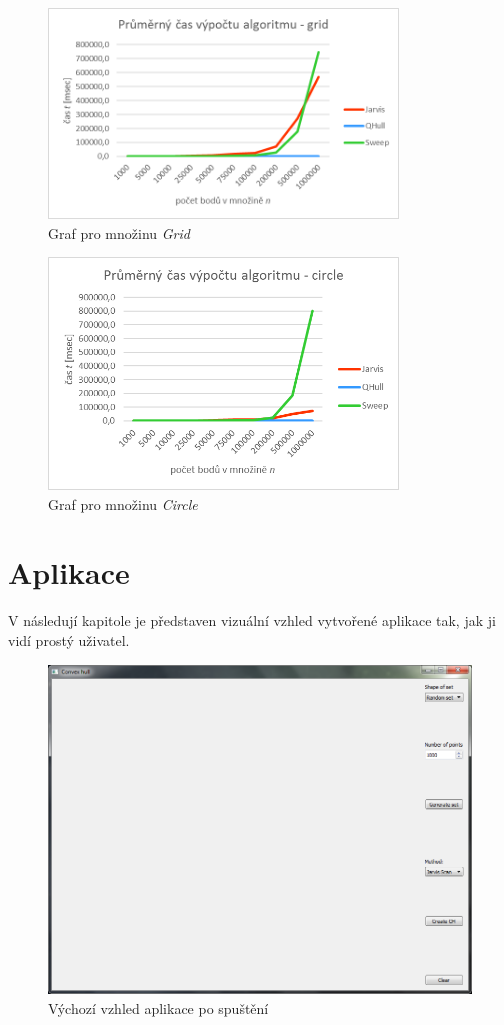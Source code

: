 \documentclass[a4paper, 12pt]{article}
\begin{document}
\begin{figure}[h!]
	\centering
	\includegraphics[width=9.3cm]{./pictures/g_grid_all.png}
	\caption{Graf pro množinu \textit{Grid}}
\end{figure}

\begin{figure}[h!]
	\centering
	\includegraphics[width=9.3cm]{./pictures/g_circ_all.png}
	\caption{Graf pro množinu \textit{Circle}}
\end{figure}

\clearpage
\section{Aplikace}
V následují kapitole je představen vizuální vzhled vytvořené aplikace tak, jak ji vidí prostý uživatel.

\begin{figure}[h!]
	\centering
	\includegraphics[width=11.5cm]{./pictures/app_default.png}
	\caption{Výchozí vzhled aplikace po spuštění}
\end{figure}
\end{document}
